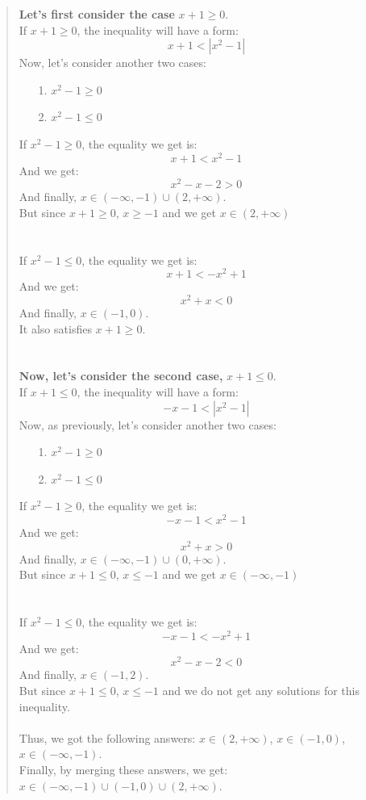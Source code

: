 \documentclass[12pt, a4paper]{article}                      %
\begin{document}
\begin{itemize}
\begin{quote}
\textbf{Let's first consider the case} $x + 1 \geq 0$.\\
If $x + 1 \geq 0$, the inequality will have a form:
$$x + 1 < |x^2 - 1|$$
Now, let's consider another two cases:
\begin{itemize}
\item[1.]
$x^2 - 1 \geq 0$
\item[2.]
$x^2 - 1 \leq 0$
\\
\end{itemize}
If $x^2 - 1 \geq 0$, the equality we get is:\\
$$x + 1 < x^2 - 1$$
And we get:
$$x^2 - x - 2 > 0$$
And finally, $x \in (-\infty, -1) \cup (2, +\infty)$.\\
But since $x + 1 \geq 0$, $x \geq -1$ and we get $x \in (2, +\infty)$
\\\\\\
If $x^2 - 1 \leq 0$, the equality we get is:\\
$$x + 1 < -x^2 + 1$$
And we get:
$$x^2 + x < 0$$
And finally, $x \in (-1, 0)$.\\
It also satisfies $x + 1 \geq 0$.
\\\\\\
\textbf{Now, let's consider the second case,} $x + 1 \leq 0$.\\
If $x + 1 \leq 0$, the inequality will have a form:
$$-x - 1 < |x^2 - 1|$$
Now, as previously, let's consider another two cases:
\begin{itemize}
\item[1.]
$x^2 - 1 \geq 0$
\item[2.]
$x^2 - 1 \leq 0$
\\
\end{itemize}
If $x^2 - 1 \geq 0$, the equality we get is:\\
$$-x - 1 < x^2 - 1$$
And we get:
$$x^2 + x > 0$$
And finally, $x \in (-\infty, -1) \cup (0, +\infty)$.\\
But since $x + 1 \leq 0$, $x \leq -1$ and we get $x \in (-\infty, -1)$
\\\\\\
If $x^2 - 1 \leq 0$, the equality we get is:\\
$$-x - 1 < -x^2 + 1$$
And we get:
$$x^2 - x -2 < 0$$
And finally, $x \in (-1, 2)$.\\
But since $x + 1 \leq 0$, $x \leq -1$ and we do not get any solutions for this inequality.
\\\\
Thus, we got the following answers: $x \in (2, +\infty)$, $x \in (-1, 0)$, $x \in (-\infty, -1)$.\\
Finally, by merging these answers, we get: $x \in (-\infty, -1) \cup (-1,0) \cup (2, +\infty)$.
\end{quote}


\end{itemize}
\end{document}
